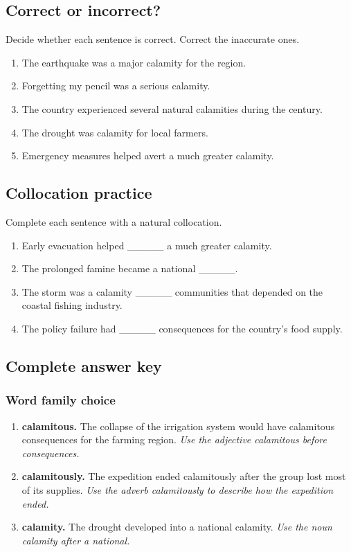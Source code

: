\documentclass[11pt]{article}
\begin{document}
\subsection{Correct or incorrect?}
Decide whether each sentence is correct. Correct the inaccurate ones.

\begin{enumerate}
  \item The earthquake was a major calamity for the region.
  \item Forgetting my pencil was a serious calamity.
  \item The country experienced several natural calamities during the century.
  \item The drought was calamity for local farmers.
  \item Emergency measures helped avert a much greater calamity.
\end{enumerate}

\subsection{Collocation practice}
Complete each sentence with a natural collocation.

\begin{enumerate}
  \item Early evacuation helped \_\_\_\_\_ a much greater calamity.
  \item The prolonged famine became a national \_\_\_\_\_.
  \item The storm was a calamity \_\_\_\_\_ communities that depended on the coastal fishing industry.
  \item The policy failure had \_\_\_\_\_ consequences for the country's food supply.
\end{enumerate}

\subsection{Complete answer key}
\subsubsection{Word family choice}
\begin{enumerate}
  \item \textbf{calamitous.} The collapse of the irrigation system would have calamitous consequences for the farming region. \emph{Use the adjective calamitous before consequences.}
  \item \textbf{calamitously.} The expedition ended calamitously after the group lost most of its supplies. \emph{Use the adverb calamitously to describe how the expedition ended.}
  \item \textbf{calamity.} The drought developed into a national calamity. \emph{Use the noun calamity after a national.}
\end{enumerate}
\end{document}
